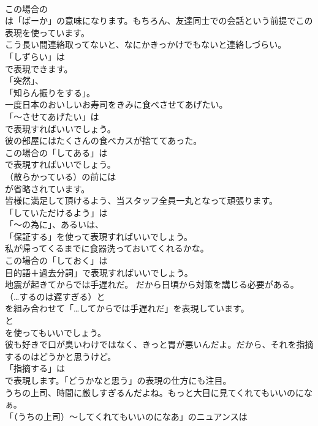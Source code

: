 \documentclass[8pt]{extreport}
\begin{document}
\begin{CJK}{UTF8}{min}
\\	この場合の
\\	は「ばーか」の意味になります。もちろん、友達同士での会話という前提でこの表現を使っています。	
\\	こう長い間連絡取ってないと、なにかきっかけでもないと連絡しづらい。 
\\	「しずらい」は
\\	で表現できます。
\\	「突然」、
\\	「知らん振りをする」。	
\\	一度日本のおいしいお寿司をきみに食べさせてあげたい。 
\\	「～させてあげたい」は 
\\	で表現すればいいでしょう。	
\\	彼の部屋にはたくさんの食べカスが捨ててあった。 
\\	この場合の「してある」は 
\\	で表現すればいいでしょう。
\\	（散らかっている）の前には 
\\	が省略されています。	
\\	皆様に満足して頂けるよう、当スタッフ全員一丸となって頑張ります。 
\\	「していただけるよう」は
\\	「～の為に」、あるいは、
\\	「保証する」を使って表現すればいいでしょう。	
\\	私が帰ってくるまでに食器洗っておいてくれるかな。 
\\	この場合の「しておく」は
\\	目的語＋過去分詞」で表現すればいいでしょう。	
\\	地震が起きてからでは手遅れだ。 だから日頃から対策を講じる必要がある。 
\\	（…するのは遅すぎる）と 
\\	を組み合わせて「…してからでは手遅れだ」を表現しています。
\\	と 
\\	を使ってもいいでしょう。	
\\	彼も好きで口が臭いわけではなく、きっと胃が悪いんだよ。だから、それを指摘するのはどうかと思うけど。 
\\	「指摘する」は
\\	で表現します。「どうかなと思う」の表現の仕方にも注目。	
\\	うちの上司、時間に厳しすぎるんだよね。もっと大目に見てくれてもいいのになぁ。 
\\	「（うちの上司）～してくれてもいいのになあ」のニュアンスは 

\end{CJK}
\end{document}
